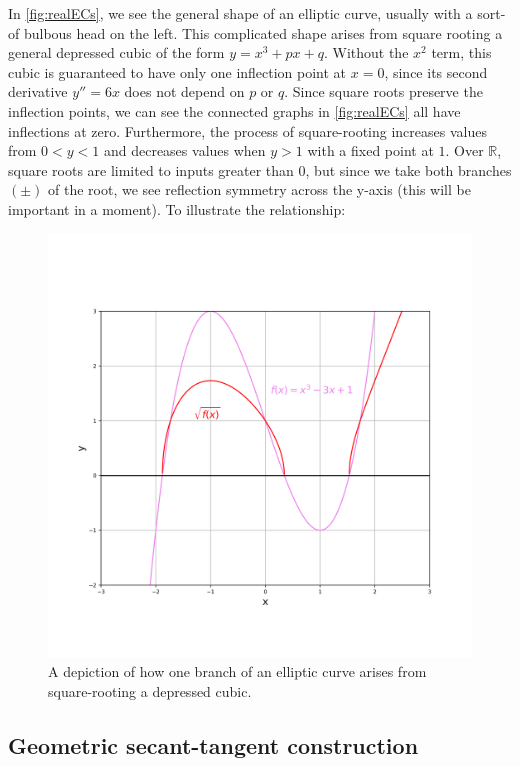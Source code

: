 \documentclass[11pt, a4paper]{report}
\newcommand{\reals}{\mathbb{R}}
\begin{document}
In \ref{fig:realECs}, we see the general shape of an elliptic curve, usually with a sort-of bulbous head on the left. This complicated shape arises from square rooting a general depressed cubic of the form $y=x^3+px+q$. Without the $x^2$ term, this cubic is guaranteed to have only one inflection point at $x=0$, since its second derivative $y'' = 6x$ does not depend on $p$ or $q$. Since square roots preserve the inflection points, we  can see the connected graphs in \ref{fig:realECs} all have inflections at zero.
Furthermore, the process of square-rooting increases values from $0<y<1$ and decreases values when $y>1$ with a fixed point at $1$. Over $\reals$, square roots are limited to inputs greater than $0$, but since we take both branches $(\pm)$ of the root, we see reflection symmetry across the y-axis (this will be important in a moment). To illustrate the relationship: 
\begin{figure}[ht]
\begin{center}
\includegraphics[width=\linewidth]{cubic_function.png} 
\caption{A depiction of how one branch of an elliptic curve arises from square-rooting a depressed cubic.}
\label{fig:cubicsqrt}
\end{center}
\end{figure}

\subsection{Geometric secant-tangent construction}
\end{document}
